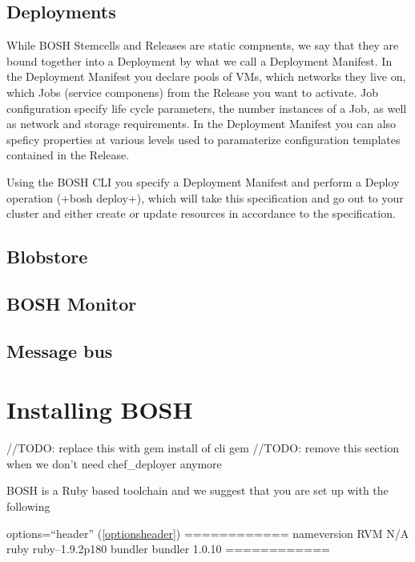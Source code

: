 \section{Deployments}
\label{deployments}

While BOSH Stemcells and Releases are static compnents, we say that they
are bound together into a Deployment by what we call a Deployment
Manifest. In the Deployment Manifest you declare pools of VMs, which
networks they live on, which Jobs (service componens) from the Release
you want to activate. Job configuration specify life cycle parameters,
the number instances of a Job, as well as network and storage
requirements. In the Deployment Manifest you can also speficy properties
at various levels used to paramaterize configuration templates contained
in the Release.

Using the BOSH CLI you specify a Deployment Manifest and perform a
Deploy operation (+bosh deploy+), which will take this specification and
go out to your cluster and either create or update resources in
accordance to the specification.

\section{Blobstore}
\label{blobstore}

\section{BOSH Monitor}
\label{boshmonitor}

\section{Message bus}
\label{messagebus}

\chapter{Installing BOSH}
\label{installingbosh}

/\slash TODO: replace this with gem install of cli gem
/\slash TODO: remove this section when we don't need chef\_deployer anymore

BOSH is a Ruby based toolchain and we suggest that you are set up with
the following 

options=``header'' (\autoref{optionsheader})
\textbar{}============
\textbar{}name\textbar{}version
\textbar{}RVM \textbar{} N\slash A
\textbar{}ruby \textbar{} ruby--1.9.2p180
\textbar{}bundler \textbar{} bundler 1.0.10
\textbar{}============

